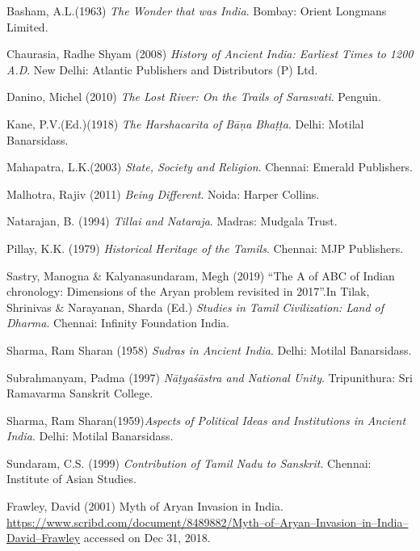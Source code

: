\begin{thebibliography}{99}
 Basham, A.L.(1963) \textit{The Wonder that was India}. Bombay: Orient Longmans Limited.

  Chaurasia, Radhe Shyam (2008) \textit{History of Ancient India: Earliest Times to 1200 A.D}. New Delhi: Atlantic Publishers and Distributors (P) Ltd.

  Danino, Michel (2010) \textit{The Lost River: On the Trails of Sarasvati}. Penguin.

  Kane, P.V.(Ed.)(1918) \textit{The Harshacarita of Bāņa Bhaṭṭa}. Delhi: Motilal Banarsidass.

  Mahapatra, L.K.(2003) \textit{State, Society and Religion}. Chennai: Emerald Publishers.

  Malhotra, Rajiv (2011) \textit{Being Different}. Noida: Harper Collins.

  Natarajan, B. (1994) \textit{Tillai and Nataraja}. Madras: Mudgala Trust.

  Pillay, K.K. (1979) \textit{Historical Heritage of the Tamils}. Chennai: MJP Publishers.

  Sastry, Manogna \& Kalyanasundaram, Megh (2019) “The A of ABC of Indian chronology: Dimensions of the Aryan problem revisited in 2017”.In Tilak, Shrinivas \& Narayanan, Sharda (Ed.) \textit{Studies in Tamil Civilization: Land of Dharma}. Chennai: Infinity Foundation India.

  Sharma, Ram Sharan (1958) \textit{Sudras in Ancient India}. Delhi: Motilal Banarsidass.

  Subrahmanyam, Padma (1997) \textit{Nāṭyaśāstra and National Unity}. Tripunithura: Sri Ramavarma Sanskrit College.

  Sharma, Ram Sharan(1959)\textit{Aspects of Political Ideas and Institutions in Ancient India}. Delhi: Motilal Banarsidass.

  Sundaram, C.S. (1999) \textit{Contribution of Tamil Nadu to Sanskrit}. Chennai: Institute of Asian Studies.

  Frawley, David (2001) Myth of Aryan Invasion in India. \url{https://www.scribd.com/document/8489882/Myth–of–Aryan–Invasion–in–India–David–Frawley} accessed on Dec 31, 2018.


\end{thebibliography}
